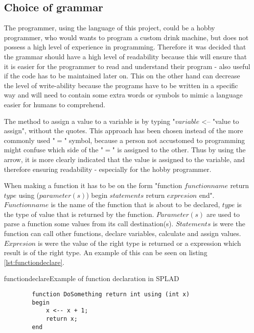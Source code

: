 \subsection{Choice of grammar}
\label{sec:grammarchoice}
The programmer, using the language of this project, could be a hobby programmer, who would wants to program a custom drink machine, but does not possess a high level of experience in programming. Therefore it was decided that the grammar should have a high level of readability because this will ensure that it is easier for the programmer to read and understand their program - also useful if the code has to be maintained later on. This on the other hand can decrease the level of write-ability because the programs have to be written in a specific way and will need to contain some extra words or symbols to mimic a language easier for humans to comprehend.

The method to assign a value to a variable is by typing "$variable$ <-- "value to assign", without the quotes. This approach has been chosen instead of the more commonly used "$=$" symbol, because a person not accustomed to programming might confuse which side of the "$=$" is assigned to the other. Thus by using the arrow, it is more clearly indicated that the value is assigned to the variable, and therefore ensuring readability - especially for the hobby programmer.

When making a function it has to be on the form "function $functionname$ return $type$ using ($parameter(s)$) begin $statements$ return $expresion$ end". $Functionname$ is the name of the function that is about to be declared, $type$ is the type of value that is returned by the function. $Parameter(s)$ are used to parse a function some values from its call destination(s). $Statements$ is were the function can call other functions, declare variables, calculate and assign values. $Expresion$ is were the value of the right type is returned or a expression which result is of the right type.
An example of this can be seen on listing \ref{lst:functiondeclare}.

\begin{code}{functiondeclare}{Example of function declaration in SPLAD}
	\begin{lstlisting}
		function DoSomething return int using (int x)
		begin
			x <-- x + 1;
			return x;
		end
	\end{lstlisting}
\end{code}

